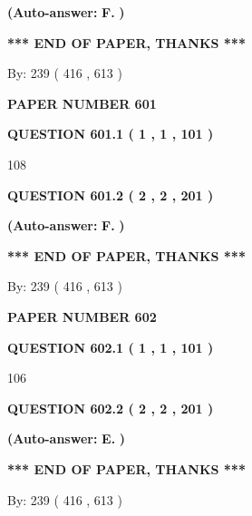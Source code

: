 \documentclass[12pt]{article}
\begin{document}
 
{\textbf{(Auto-answer:}}
{\textbf{\large{
F.}}}
{\textbf{)}}
 
 
   
   
   
   
\vspace{1.0in} 
{\textbf{\large{ *** END OF PAPER, THANKS *** }}} 
   
   
\hspace{1.0in} By: 
 239 ( 416 ,  613 )
   
   
   
   
\newpage 
\setcounter{page}{ 
   601001 } 
   
   
 {\textbf{ \Large{ PAPER NUMBER  601  }}}
   
   
   
   
  
  
{\textbf{\large{QUESTION
601.1 
 ( 1 , 1 , 101 )
}}}

108
  
  
{\textbf{\large{QUESTION
601.2 
 ( 2 , 2 , 201 )
}}}
 
 
{\textbf{(Auto-answer:}}
{\textbf{\large{
F.}}}
{\textbf{)}}
 
 
   
   
   
   
\vspace{1.0in} 
{\textbf{\large{ *** END OF PAPER, THANKS *** }}} 
   
   
\hspace{1.0in} By: 
 239 ( 416 ,  613 )
   
   
   
   
\newpage 
\setcounter{page}{ 
   602001 } 
   
   
 {\textbf{ \Large{ PAPER NUMBER  602  }}}
   
   
   
   
  
  
{\textbf{\large{QUESTION
602.1 
 ( 1 , 1 , 101 )
}}}

106
  
  
{\textbf{\large{QUESTION
602.2 
 ( 2 , 2 , 201 )
}}}
 
 
{\textbf{(Auto-answer:}}
{\textbf{\large{
E.}}}
{\textbf{)}}
 
 
   
   
   
   
\vspace{1.0in} 
{\textbf{\large{ *** END OF PAPER, THANKS *** }}} 
   
   
\hspace{1.0in} By: 
 239 ( 416 ,  613 )
   
   
   
\end{document}
